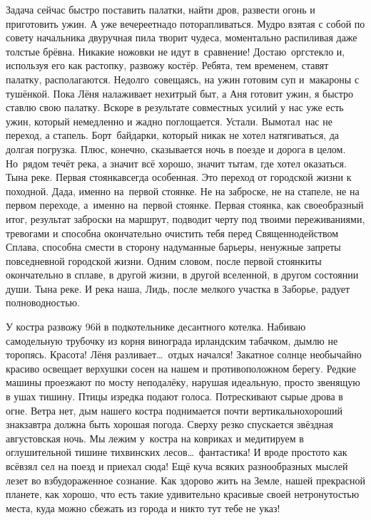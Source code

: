 Задача сейчас быстро поставить палатки, найти дров, развести огонь и приготовить ужин. А уже вечереет\mdash надо поторапливаться. Мудро взятая с собой по совету начальника двуручная пила творит чудеса, моментально распиливая даже толстые брёвна. Никакие ножовки не идут в~сравнение! Достаю~оргстекло и, используя его как растопку, развожу костёр. Ребята, тем временем, ставят палатку, располагаются. Недолго~совещаясь, на ужин готовим суп и~макароны с тушёнкой. Пока Лёня налаживает нехитрый быт, а Аня готовит ужин, я быстро ставлю свою палатку. Вскоре в результате совместных усилий у нас уже есть ужин, который немедленно и жадно поглощается. Устали. Вымотал~нас не переход, а стапель. Борт~байдарки, который никак не хотел натягиваться, да долгая погрузка. Плюс, конечно, сказывается ночь в поезде и дорога в целом. Но~рядом течёт река, а значит всё хорошо, значит ты\mdash там, где хотел оказаться. Ты\mdash на реке. 
\newpage
Первая стоянка\mdash всегда особенная. Это переход от городской жизни к походной. Да\sdash да, именно на~первой стоянке. Не на заброске, не на стапеле, не на первом переходе, а~именно на~первой стоянке. Первая стоянка, как своеобразный итог, результат заброски на маршрут, подводит черту под твоими переживаниями, тревогами и способна окончательно очистить тебя перед Священнодейством Сплава, способна смести в сторону надуманные барьеры, ненужные запреты повседневной городской жизни. Одним словом, после первой стоянки\mdash ты окончательно в сплаве, в другой жизни, в другой вселенной, в другом состоянии души. Ты\mdash на реке. И река наша, Лидь, после мелкого участка в Заборье, радует полноводностью.

У костра развожу 96\sdash й в подкотельнике десантного котелка. Набиваю самодельную трубочку из корня винограда ирландским табачком, дымлю не торопясь. Красота! Лёня разливает\ldots~отдых начался! Закатное солнце необычайно красиво освещает верхушки сосен на нашем и противоположном берегу. Редкие машины проезжают по мосту неподалёку, нарушая идеальную, просто звенящую в ушах тишину. Птицы изредка подают голоса. Потрескивают сырые дрова в огне. Ветра нет, дым нашего костра поднимается почти вертикально\mdash хороший знак\mdash завтра должна быть хорошая погода. Сверху резко спускается звёздная августовская ночь. Мы лежим у~костра на ковриках и медитируем в оглушительной тишине тихвинских лесов\ldots~фантастика! И вроде просто\sdash то как всё\mdash взял сел на поезд и приехал сюда! Ещё куча всяких разнообразных мыслей лезет во взбудораженное сознание. Как здорово жить на Земле, нашей прекрасной планете, как хорошо, что есть такие удивительно красивые своей нетронутостью места, куда можно сбежать из города и никто тут тебе не указ!

